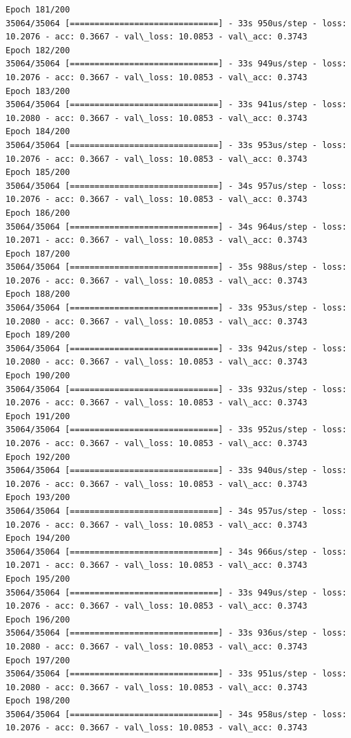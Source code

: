\documentclass[11pt]{article}
\begin{document}
\begin{Verbatim}[commandchars=\\\{\}]
Epoch 181/200
35064/35064 [==============================] - 33s 950us/step - loss: 10.2076 - acc: 0.3667 - val\_loss: 10.0853 - val\_acc: 0.3743
Epoch 182/200
35064/35064 [==============================] - 33s 949us/step - loss: 10.2076 - acc: 0.3667 - val\_loss: 10.0853 - val\_acc: 0.3743
Epoch 183/200
35064/35064 [==============================] - 33s 941us/step - loss: 10.2080 - acc: 0.3667 - val\_loss: 10.0853 - val\_acc: 0.3743
Epoch 184/200
35064/35064 [==============================] - 33s 953us/step - loss: 10.2076 - acc: 0.3667 - val\_loss: 10.0853 - val\_acc: 0.3743
Epoch 185/200
35064/35064 [==============================] - 34s 957us/step - loss: 10.2076 - acc: 0.3667 - val\_loss: 10.0853 - val\_acc: 0.3743
Epoch 186/200
35064/35064 [==============================] - 34s 964us/step - loss: 10.2071 - acc: 0.3667 - val\_loss: 10.0853 - val\_acc: 0.3743
Epoch 187/200
35064/35064 [==============================] - 35s 988us/step - loss: 10.2076 - acc: 0.3667 - val\_loss: 10.0853 - val\_acc: 0.3743
Epoch 188/200
35064/35064 [==============================] - 33s 953us/step - loss: 10.2080 - acc: 0.3667 - val\_loss: 10.0853 - val\_acc: 0.3743
Epoch 189/200
35064/35064 [==============================] - 33s 942us/step - loss: 10.2080 - acc: 0.3667 - val\_loss: 10.0853 - val\_acc: 0.3743
Epoch 190/200
35064/35064 [==============================] - 33s 932us/step - loss: 10.2076 - acc: 0.3667 - val\_loss: 10.0853 - val\_acc: 0.3743
Epoch 191/200
35064/35064 [==============================] - 33s 952us/step - loss: 10.2076 - acc: 0.3667 - val\_loss: 10.0853 - val\_acc: 0.3743
Epoch 192/200
35064/35064 [==============================] - 33s 940us/step - loss: 10.2076 - acc: 0.3667 - val\_loss: 10.0853 - val\_acc: 0.3743
Epoch 193/200
35064/35064 [==============================] - 34s 957us/step - loss: 10.2076 - acc: 0.3667 - val\_loss: 10.0853 - val\_acc: 0.3743
Epoch 194/200
35064/35064 [==============================] - 34s 966us/step - loss: 10.2071 - acc: 0.3667 - val\_loss: 10.0853 - val\_acc: 0.3743
Epoch 195/200
35064/35064 [==============================] - 33s 949us/step - loss: 10.2076 - acc: 0.3667 - val\_loss: 10.0853 - val\_acc: 0.3743
Epoch 196/200
35064/35064 [==============================] - 33s 936us/step - loss: 10.2080 - acc: 0.3667 - val\_loss: 10.0853 - val\_acc: 0.3743
Epoch 197/200
35064/35064 [==============================] - 33s 951us/step - loss: 10.2080 - acc: 0.3667 - val\_loss: 10.0853 - val\_acc: 0.3743
Epoch 198/200
35064/35064 [==============================] - 34s 958us/step - loss: 10.2076 - acc: 0.3667 - val\_loss: 10.0853 - val\_acc: 0.3743

\end{Verbatim}
\end{document}
